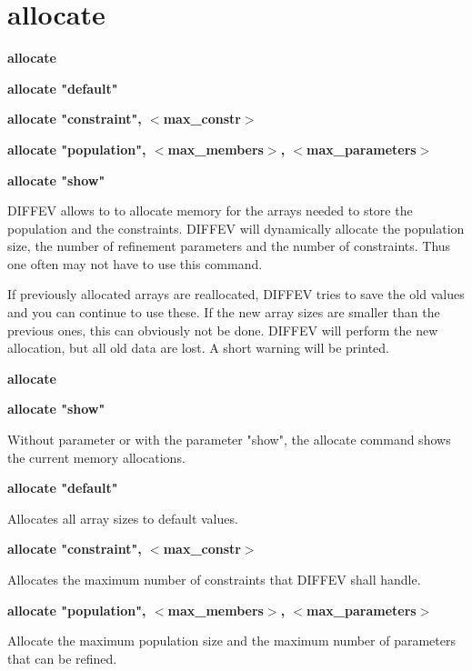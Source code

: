 \section{allocate}
{\bf allocate \par }
{\bf allocate "default" \par }
{\bf allocate "constraint", $ <$max\_constr$> $ \par }
{\bf allocate "population", $ <$max\_members$> $, $ <$max\_parameters$> $ \par }
{\bf allocate "show" \par }
\par
\vspace{3pt}
DIFFEV allows to to allocate memory for the arrays needed to store the 
population and the constraints. DIFFEV will dynamically allocate 
the population size, the number of refinement parameters and the 
number of constraints. 
Thus one often may not have to use this command. 
\par
If previously allocated arrays are reallocated, DIFFEV tries to save 
the old values and you can continue to use these. If the new array 
sizes are smaller than the previous ones, this can obviously not be 
done. DIFFEV will perform the new allocation, but all old data are lost. 
A short warning will be printed. 
\par
{\bf allocate \par }
{\bf allocate "show" \par }
\par
\vspace{3pt}
Without parameter or with the parameter "show", the allocate command 
shows the current memory allocations. 
\par
{\bf allocate "default" \par }
\vspace{3pt}
Allocates all array sizes to default values. 
\par
{\bf allocate "constraint", $ <$max\_constr$> $ \par }
\par
\vspace{3pt}
Allocates the maximum number of constraints that DIFFEV shall handle. 
\par
{\bf allocate "population", $ <$max\_members$> $, $ <$max\_parameters$> $ \par }
\vspace{3pt}
Allocate the maximum population size and the maximum number of 
parameters that can be refined. 
